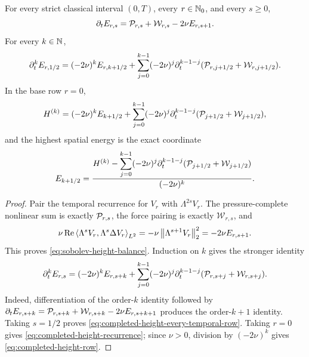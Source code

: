 \begin{proposition}
\label{prop:completed-height-recurrence}
For every strict classical interval \((0,T)\), every \(r\in\mathbb N_0\), and
every \(s\ge0\),
\begin{equation}
 \partial_tE_{r,s}=\mathcal P_{r,s}+\mathcal W_{r,s}-2\nu E_{r,s+1}.
 \label{eq:sobolev-height-balance}
\end{equation}
For every \(k\in\mathbb N\),
\begin{equation}
 \partial_t^kE_{r,1/2}
 =(-2\nu)^kE_{r,k+1/2}
 +\sum_{j=0}^{k-1}(-2\nu)^j
   \partial_t^{k-1-j}
   (\mathcal P_{r,j+1/2}+\mathcal W_{r,j+1/2}).
 \label{eq:completed-height-every-temporal-row}
\end{equation}
In the base row \(r=0\),
\begin{equation}
 H^{(k)}
 =(-2\nu)^kE_{k+1/2}
 +\sum_{j=0}^{k-1}(-2\nu)^j
   \partial_t^{k-1-j}(\mathcal P_{j+1/2}+\mathcal W_{j+1/2}),
 \label{eq:completed-height-recurrence}
\end{equation}
and the highest spatial energy is the exact coordinate
\begin{equation}
 E_{k+1/2}
 =\frac{H^{(k)}-
   \displaystyle\sum_{j=0}^{k-1}(-2\nu)^j
   \partial_t^{k-1-j}(\mathcal P_{j+1/2}+\mathcal W_{j+1/2})}
 {(-2\nu)^k}.
 \label{eq:completed-height-row}
\end{equation}
\end{proposition}

\begin{proof}
Pair the temporal recurrence for \(V_r\) with \(\Lambda^{2s}V_r\).
The pressure-complete nonlinear sum is exactly \(\mathcal P_{r,s}\), the force
pairing is exactly \(\mathcal W_{r,s}\), and
\[
 \nu\operatorname{Re}\left\langle \Lambda^sV_r,\Lambda^s\Delta V_r\right\rangle_{L^2}
 =-\nu\left\lVert \Lambda^{s+1}V_r\right\rVert_2^2=-2\nu E_{r,s+1}.
\]
This proves \eqref{eq:sobolev-height-balance}.  Induction on \(k\) gives
the stronger identity
\begin{equation}
 \partial_t^kE_{r,s}
 =(-2\nu)^kE_{r,s+k}
 +\sum_{j=0}^{k-1}(-2\nu)^j
   \partial_t^{k-1-j}(\mathcal P_{r,s+j}+\mathcal W_{r,s+j}).
 \label{eq:all-height-recurrence}
\end{equation}
Indeed, differentiation of the order-\(k\) identity followed by
\(\partial_tE_{r,s+k}=\mathcal P_{r,s+k}+\mathcal W_{r,s+k}
-2\nu E_{r,s+k+1}\) produces the
order-\(k+1\) identity.  Taking \(s=1/2\) proves
\eqref{eq:completed-height-every-temporal-row}.  Taking \(r=0\) gives
\eqref{eq:completed-height-recurrence}; since \(\nu>0\), division by
\((-2\nu)^k\) gives \eqref{eq:completed-height-row}.
\end{proof}

